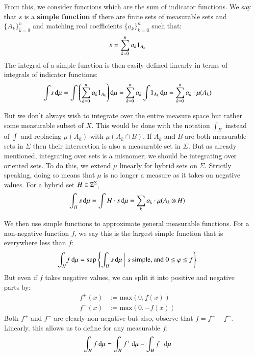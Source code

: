 From this, we consider functions which are the sum of indicator functions.
We say that $s$ is a \textbf{simple function} if there are finite sets of measurable sets and $\{ A_k \}_{k=0}^n$
and matching real coefficients $\{ a_k \}_{k=0}^n$ such that:
\begin{equation}
	s = \sum_{k=0}^n a_k \ind[A_k]
\end{equation}
The integral of a simple function is then easily defined linearly in terms of integrals of indicator functions:
\begin{equation}
	\int \! s \diff \mu 
		= \int \left(\sum_{k=0}^n a_k \ind[A_k] \right) \diff \mu 
		= \sum_{k=0}^n a_k  \int \! \ind[A_k] \diff \mu
		= \sum_{k=0}^n a_k \cdot \mu(A_k)
\end{equation}

But we don't always wish to integrate over the entire measure space but rather some measurable subset of $X$.
This would be done with the notation $\int_B$ instead of $\int$ and replacing $\mu(A_k)$ with $\mu(A_k \cap B)$.
If $A_k$ and $B$ are both measurable sets in $\Sigma$ then their intersection is also a measurable set in $\Sigma$.
But as already mentioned, integrating over sets is a misnomer; we should be integrating over oriented sets.
To do this, we extend $\mu$ linearly for hybrid sets on $\Sigma$.
Strictly speaking, doing so means that $\mu$ is no longer a measure as it takes on negative values.
For a hybrid set $H \in \hsetover[\Sigma]$,
\begin{equation}
	\int_H s \mathop{}\!\mathrm{d} \mu = \int H \cdot s \mathop{}\!\mathrm{d} \mu = \sum_k a_k \cdot \mu(A_k \otimes H)
\end{equation}


We then use simple functions to approximate general measurable functions.
For a non-negative function $f$, we say this is the largest simple function that is everywhere less than $f$:
\begin{equation}
	\int_H \! f \mathop{}\!\mathrm{d}\mu = 
		\text{sup} \left\{ 
			\int_H s \mathop{}\!\mathrm{d} \mu \;\middle|\; s \text{ simple, and } 0 \leq \varphi \leq f 
		\right\}
\end{equation}
But even if $f$ takes negative values, we can split it into positive and negative parts by:
\begin{align}
f^+(x) &:= \mathrm{max}( 0, f(x)) \\
f^-(x) &:= \mathrm{max}(0, -f(x)) 
\end{align}
Both $f^+$ and $f^-$ are clearly non-negative but also, observe that $f=f^+ - f^-$.
Linearly, this allows us to define for any measurable $f$:
\begin{equation}
\int_H f \mathop{}\!\mathrm{d} \mu = \int_H f^+ \mathop{}\!\mathrm{d} \mu - \int_H f^- \mathop{}\!\mathrm{d} \mu
\end{equation}


